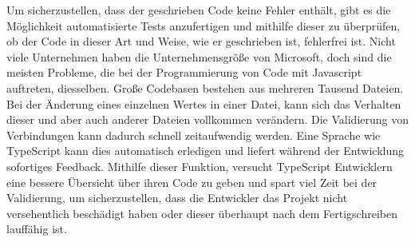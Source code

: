 Um sicherzustellen, dass der geschrieben Code keine Fehler enthält, gibt es die Möglichkeit automatisierte Tests anzufertigen und mithilfe dieser zu überprüfen, ob der Code in dieser Art und Weise, wie er geschrieben ist, fehlerfrei ist.
Nicht viele Unternehmen haben die Unternehmensgröße von Microsoft, doch sind die meisten Probleme, die bei der Programmierung von Code mit Javascript auftreten, diesselben. Große Codebasen bestehen aus mehreren Tausend Dateien. Bei der Änderung eines einzelnen Wertes in einer Datei, kann sich das Verhalten dieser und aber auch anderer Dateien vollkommen verändern.
Die Validierung von Verbindungen kann dadurch schnell zeitaufwendig werden. Eine Sprache wie TypeScript kann dies automatisch erledigen und liefert während der Entwicklung sofortiges Feedback. Mithilfe dieser Funktion, versucht TypeScript Entwicklern eine bessere Übersicht über ihren Code zu geben und spart viel Zeit bei der Validierung, um sicherzustellen, dass die Entwickler das Projekt nicht versehentlich beschädigt haben oder dieser überhaupt nach dem Fertigschreiben lauffähig ist.

\cite{ScriptWiki}
